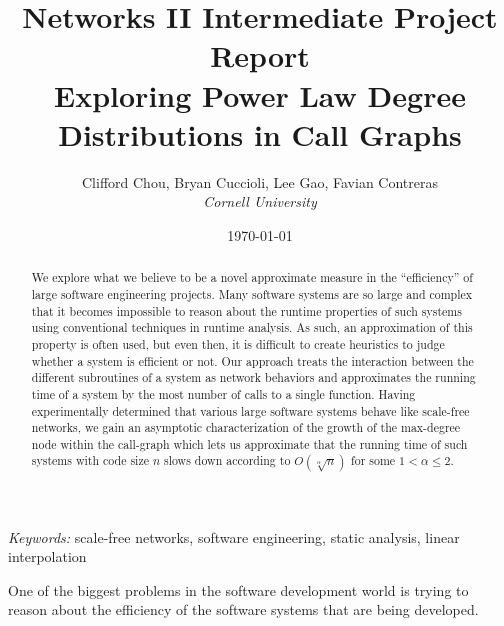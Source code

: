 \documentclass[12pt,a4paper]{article}
\author{Clifford Chou, Bryan Cuccioli, Lee Gao, 
Favian Contreras\\{\textit{Cornell University}}}
\date{\today}
\title{\textbf{Networks II Intermediate Project Report}\\ %
{\small Exploring Power Law Degree Distributions in Call Graphs}} %
\begin{document}

\maketitle

\renewcommand{\abstractname}{Abstract} %

\begin{abstract}
We explore what we believe to be a novel approximate measure in the ``efficiency'' of large software engineering projects. Many software systems are so large and complex that it becomes impossible to reason about the runtime properties of such systems using conventional techniques in runtime analysis. As such, an approximation of this property is often used, but even then, it is difficult to create heuristics to judge whether a system is efficient or not. Our approach treats the interaction between the different subroutines of a system as network behaviors and approximates the running time of a system by the most number of calls to a single function. Having experimentally determined that various large software systems behave like scale-free networks, we gain an asymptotic characterization of the growth of the max-degree node within the call-graph which lets us approximate that the running time of such systems with code size $n$ slows down according to $O(\sqrt[\alpha]{n})$ for some $1 < \alpha \le 2$.
\end{abstract}

\hspace*{3,6mm}\textit{Keywords:} {\sf \small  scale-free networks, software engineering, static analysis, linear interpolation} %

\vspace{30pt} %


One of the biggest problems in the software development world is trying to reason about the efficiency of the software systems that are being developed.


\medskip

\printbibliography[title={References}]
\end{document}
